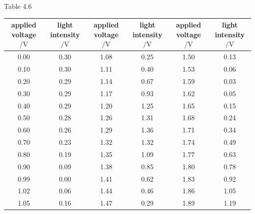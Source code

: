 \begin{center}
{\small Table 4.6}\\[3pt]
{\footnotesize
\renewcommand{\arraystretch}{1.08}
\begin{tabular}{|c|c||c|c||c|c|}
\hline
\shortstack{applied\\[-2pt]voltage$/\mathrm{V}$} & \shortstack{light\\[-2pt]intensity$/\mathrm{V}$} & \shortstack{applied\\[-2pt]voltage$/\mathrm{V}$} & \shortstack{light\\[-2pt]intensity$/\mathrm{V}$} & \shortstack{applied\\[-2pt]voltage$/\mathrm{V}$} & \shortstack{light\\[-2pt]intensity$/\mathrm{V}$}\\
\hline
0.00 & 0.30 & 1.08 & 0.25 & 1.50 & 0.13\\
\hline
0.10 & 0.30 & 1.11 & 0.40 & 1.53 & 0.06\\
\hline
0.20 & 0.29 & 1.14 & 0.67 & 1.59 & 0.03\\
\hline
0.30 & 0.29 & 1.17 & 0.93 & 1.62 & 0.05\\
\hline
0.40 & 0.29 & 1.20 & 1.25 & 1.65 & 0.15\\
\hline
0.50 & 0.28 & 1.26 & 1.31 & 1.68 & 0.24\\
\hline
0.60 & 0.26 & 1.29 & 1.36 & 1.71 & 0.34\\
\hline
0.70 & 0.23 & 1.32 & 1.32 & 1.74 & 0.49\\
\hline
0.80 & 0.19 & 1.35 & 1.09 & 1.77 & 0.63\\
\hline
0.90 & 0.09 & 1.38 & 0.85 & 1.80 & 0.78\\
\hline
0.99 & 0.00 & 1.41 & 0.62 & 1.83 & 0.92\\
\hline
1.02 & 0.06 & 1.44 & 0.46 & 1.86 & 1.05\\
\hline
1.05 & 0.16 & 1.47 & 0.29 & 1.89 & 1.19\\
\hline
\end{tabular}}
\end{center}

